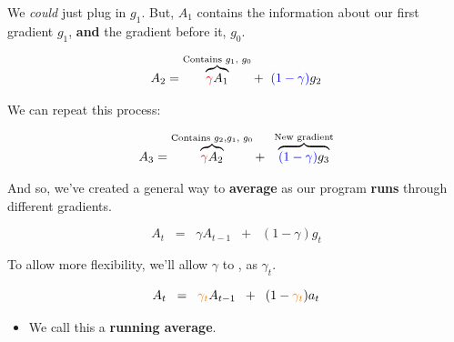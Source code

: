             We \textit{could} just plug in $g_1$. But, $A_1$ contains the information about our first gradient $g_1$, \textbf{and} the gradient before it, $g_0$.
            
            \begin{equation}
                A_2
                =
                \overbrace{
                    \textcolor{red}{\gamma} A_1
                }^{\text{Contains $g_1$, $g_0$}}
                + \;\;
                \textcolor{blue}{(1-\gamma)} g_2
            \end{equation}
            
            We can repeat this process:
            
            \begin{equation}
                A_3 = 
                \overbrace{
                    \textcolor{red}{\gamma} A_{2}
                }^{\text{Contains $g_2$,$g_1$, $g_0$}}
                + \;\;
                \overbrace{
                    \textcolor{blue}{(1-\gamma)} g_3
                }^{\text{New gradient}}
            \end{equation}

            And so, we've created a general way to \textbf{average} as our program \textbf{runs} through different gradients.

            \begin{equation}
                A_t \;\;=\;\; 
                \gamma A_{t-1} \;\;+\;\; 
                (1-\gamma) g_t
            \end{equation}

            To allow more flexibility, we'll allow $\gamma$ to , as $\gamma_t$.
            
            \begin{equation}
                A_t \;\;=\;\; 
                \textcolor{orange}{\gamma_t} A_{t-1} \;\;+\;\; 
                (1-\textcolor{orange}{\gamma_t}) a_t
            \end{equation}

            \begin{itemize}
                \item We call this a \textbf{running average}.\\
            \end{itemize}

